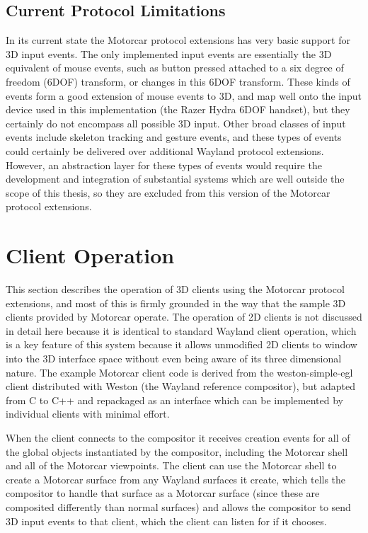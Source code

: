 \subsection{Current Protocol Limitations}
In its current state the Motorcar protocol extensions has very basic support for 3D input events. The only implemented input events are essentially the 3D equivalent of mouse events, such as button pressed attached to a six degree of freedom (6DOF) transform, or changes in this 6DOF transform. These kinds of events form a good extension of mouse events to 3D, and map well onto the input device used in this implementation (the Razer Hydra 6DOF handset), but they certainly do not encompass all possible 3D input. Other broad classes of input events include skeleton tracking and gesture events, and these types of events could certainly be delivered over additional Wayland protocol extensions. However, an abstraction layer for these types of events would require the development and integration of substantial systems which are well outside the scope of this thesis, so they are excluded from this version of the Motorcar protocol extensions.

\section{Client Operation}

This section describes the operation of 3D clients using the Motorcar protocol extensions, and most of this is firmly grounded in the way that the sample 3D clients provided by Motorcar operate. The operation of 2D clients is not discussed in detail here because it is identical to standard Wayland client operation, which is a key feature of this system because it allows unmodified 2D clients to window into the 3D interface space without even being aware of its three dimensional nature. The example Motorcar client code is derived from the weston-simple-egl client distributed with Weston (the Wayland reference compositor), but adapted from C to C++ and repackaged as an interface which can be implemented by individual clients with minimal effort.

When the client connects to the compositor it receives creation events for all of the global objects instantiated by the compositor, including the Motorcar shell and all of the Motorcar viewpoints. The client can use the Motorcar shell to create a Motorcar surface from any Wayland surfaces it create, which tells the compositor to handle that surface as a Motorcar surface (since these are composited differently than normal surfaces) and allows the compositor to send 3D input events to that client, which the client can listen for if it chooses. 

